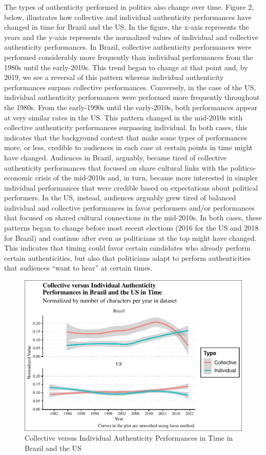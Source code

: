 \documentclass[smallextended]{svjour3}       %
\begin{document}
The types of authenticity performed in politics also change over time.
Figure 2, below, illustrates how collective and individual authenticity
performances have changed in time for Brazil and the US. In the figure,
the x-axis represents the years and the y-axis represents the normalized
values of individual and collective authenticity performances. In
Brazil, collective authenticity performances were performed considerably
more frequently than individual performances from the 1980s until the
early-2010s. This trend began to change at that point and, by 2019, we
see a reversal of this pattern whereas individual authenticity
performances surpass collective performances. Conversely, in the case of
the US, individual authenticity performances were performed more
frequently throughout the 1980s. From the early-1990s until the
early-2010s, both performances appear at very similar rates in the US.
This pattern changed in the mid-2010s with collective authenticity
performances surpassing individual. In both cases, this indicates that
the background context that make some types of performances more, or
less, credible to audiences in each case at certain points in time might
have changed. Audiences in Brazil, arguably, became tired of collective
authenticity performances that focused on share cultural links with the
politico-economic crisis of the mid-2010s and, in turn, became more
interested in simpler individual performances that were credible based
on expectations about political performers. In the US, instead,
audiences arguably grew tired of balanced individual and collective
performances in favor performers and/or performances that focused on
shared cultural connections in the mid-2010s. In both cases, these
patterns began to change before most recent elections (2016 for the US
and 2018 for Brazil) and continue after even as politicians at the top
might have changed. This indicates that timing could favor certain
candidates who already perform certain authenticities, but also that
politicians adapt to perform authenticities that audiences ``want to
hear'' at certain times.

\begin{figure}
\centering
\includegraphics{antipc_files/figure-latex/Figure 2-1.pdf}
\caption{Collective versus Individual Authenticity Performances in Time
in Brazil and the US}
\end{figure}
\end{document}

